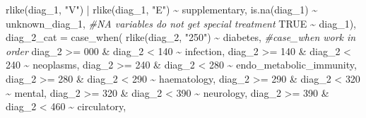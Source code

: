 \documentclass[
]{article}
\newenvironment{Shaded}{\begin{snugshade}}{\end{snugshade}}
\newcommand{\AttributeTok}[1]{\textcolor[rgb]{0.77,0.63,0.00}{#1}}
\newcommand{\CommentTok}[1]{\textcolor[rgb]{0.56,0.35,0.01}{\textit{#1}}}
\newcommand{\ConstantTok}[1]{\textcolor[rgb]{0.00,0.00,0.00}{#1}}
\newcommand{\DecValTok}[1]{\textcolor[rgb]{0.00,0.00,0.81}{#1}}
\newcommand{\FunctionTok}[1]{\textcolor[rgb]{0.00,0.00,0.00}{#1}}
\newcommand{\NormalTok}[1]{#1}
\newcommand{\SpecialCharTok}[1]{\textcolor[rgb]{0.00,0.00,0.00}{#1}}
\newcommand{\StringTok}[1]{\textcolor[rgb]{0.31,0.60,0.02}{#1}}
\begin{document}
\begin{Shaded}
\begin{Highlighting}[]
      \FunctionTok{rlike}\NormalTok{(diag\_1, }\StringTok{"V"}\NormalTok{) }\SpecialCharTok{|} \FunctionTok{rlike}\NormalTok{(diag\_1, }\StringTok{"E"}\NormalTok{) }\SpecialCharTok{\textasciitilde{}} \StringTok{\textquotesingle{}supplementary\textquotesingle{}}\NormalTok{,}
      \FunctionTok{is.na}\NormalTok{(diag\_1) }\SpecialCharTok{\textasciitilde{}} \StringTok{\textquotesingle{}unknown\_diag\_1\textquotesingle{}}\NormalTok{, }\CommentTok{\#NA variables do not get special treatment}
      \ConstantTok{TRUE} \SpecialCharTok{\textasciitilde{}}\NormalTok{ diag\_1),}
    \AttributeTok{diag\_2\_cat =} \FunctionTok{case\_when}\NormalTok{(}
      \FunctionTok{rlike}\NormalTok{(diag\_2, }\StringTok{"250"}\NormalTok{) }\SpecialCharTok{\textasciitilde{}} \StringTok{\textquotesingle{}diabetes\textquotesingle{}}\NormalTok{, }\CommentTok{\#case\_when work in order}
\NormalTok{      diag\_2 }\SpecialCharTok{\textgreater{}=} \DecValTok{000} \SpecialCharTok{\&}\NormalTok{ diag\_2 }\SpecialCharTok{\textless{}} \DecValTok{140} \SpecialCharTok{\textasciitilde{}} \StringTok{\textquotesingle{}infection\textquotesingle{}}\NormalTok{,}
\NormalTok{      diag\_2 }\SpecialCharTok{\textgreater{}=} \DecValTok{140} \SpecialCharTok{\&}\NormalTok{ diag\_2 }\SpecialCharTok{\textless{}} \DecValTok{240} \SpecialCharTok{\textasciitilde{}} \StringTok{\textquotesingle{}neoplasms\textquotesingle{}}\NormalTok{,}
\NormalTok{      diag\_2 }\SpecialCharTok{\textgreater{}=} \DecValTok{240} \SpecialCharTok{\&}\NormalTok{ diag\_2 }\SpecialCharTok{\textless{}} \DecValTok{280} \SpecialCharTok{\textasciitilde{}} \StringTok{\textquotesingle{}endo\_metabolic\_immunity\textquotesingle{}}\NormalTok{,}
\NormalTok{      diag\_2 }\SpecialCharTok{\textgreater{}=} \DecValTok{280} \SpecialCharTok{\&}\NormalTok{ diag\_2 }\SpecialCharTok{\textless{}} \DecValTok{290} \SpecialCharTok{\textasciitilde{}} \StringTok{\textquotesingle{}haematology\textquotesingle{}}\NormalTok{,}
\NormalTok{      diag\_2 }\SpecialCharTok{\textgreater{}=} \DecValTok{290} \SpecialCharTok{\&}\NormalTok{ diag\_2 }\SpecialCharTok{\textless{}} \DecValTok{320} \SpecialCharTok{\textasciitilde{}} \StringTok{\textquotesingle{}mental\textquotesingle{}}\NormalTok{,}
\NormalTok{      diag\_2 }\SpecialCharTok{\textgreater{}=} \DecValTok{320} \SpecialCharTok{\&}\NormalTok{ diag\_2 }\SpecialCharTok{\textless{}} \DecValTok{390} \SpecialCharTok{\textasciitilde{}} \StringTok{\textquotesingle{}neurology\textquotesingle{}}\NormalTok{,}
\NormalTok{      diag\_2 }\SpecialCharTok{\textgreater{}=} \DecValTok{390} \SpecialCharTok{\&}\NormalTok{ diag\_2 }\SpecialCharTok{\textless{}} \DecValTok{460} \SpecialCharTok{\textasciitilde{}} \StringTok{\textquotesingle{}circulatory\textquotesingle{}}\NormalTok{,}

\end{Highlighting}
\end{Shaded}
\end{document}
